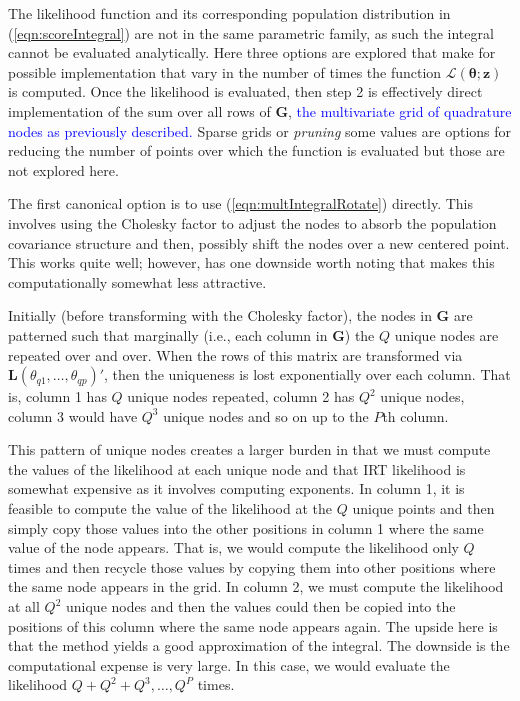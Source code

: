 \documentclass[12pt]{article}
\begin{document}
The likelihood function and its corresponding population distribution in (\ref{eqn:scoreIntegral}) are not in the same parametric family, as such the integral cannot be evaluated analytically. Here three options are explored that make for possible implementation that vary in the number of times the function $\mathcal{L}(\bm{\theta};\bm{z})$ is computed. Once the likelihood is evaluated, then step 2 is effectively direct implementation of the sum over all rows of $\bm{G}$, \textcolor{blue}{the multivariate grid of quadrature nodes as previously described.} Sparse grids or \textit{pruning} some values are options for reducing the number of points over which the function is evaluated but those are not explored here. 

The first canonical option is to use (\ref{eqn:multIntegralRotate}) directly. This involves using the Cholesky factor to adjust the nodes to absorb the population covariance structure and then, possibly shift the nodes over a new centered point. This works quite well; however, has one downside worth noting that makes this computationally somewhat less attractive. 

Initially (before transforming with the Cholesky factor), the nodes in $\bm{G}$ are patterned such that marginally (i.e., each column in $\bm{G}$) the $Q$ unique nodes are repeated over and over. When the rows of this matrix are transformed via $\bm{L}(\theta_{q1}, \ldots, \theta_{qp})'$, then the uniqueness is lost exponentially over each column. That is, column 1 has $Q$ unique nodes repeated, column 2 has $Q^2$ unique nodes, column 3 would have $Q^3$ unique nodes and so on up to the $P$th column. 

This pattern of unique nodes creates a larger burden in that we must compute the values of the likelihood at each unique node and that IRT likelihood is somewhat expensive as it involves computing exponents. In column 1, it is feasible to compute the value of the likelihood at the $Q$ unique points and then simply copy those values into the other positions in column 1 where the same value of the node appears. That is, we would compute the likelihood only $Q$ times and then recycle those values by copying them into other positions where the same node appears in the grid. In column 2, we must compute the likelihood at all $Q^2$ unique nodes and then the values could then be copied into the positions of this column where the same node appears again. The upside here is that the method yields a good approximation of the integral. The downside is the computational expense is very large. In this case, we would evaluate the likelihood $Q + Q^2 + Q^3, \ldots, Q^P$ times.
\end{document}
